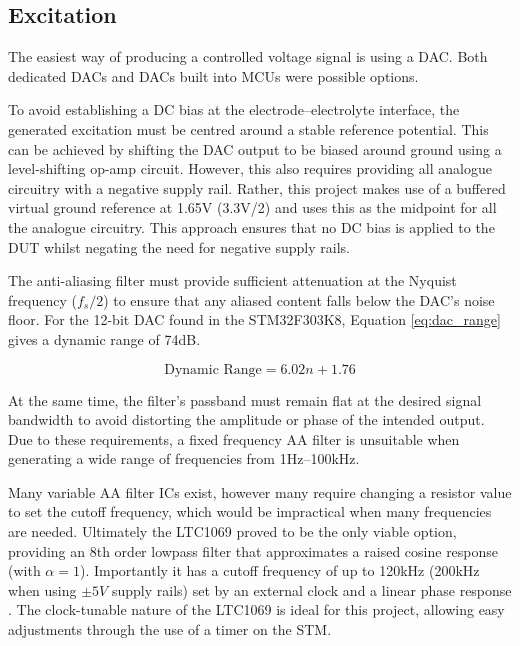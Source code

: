 
\subsection{Excitation}\label{subsec:design_excitation}
The easiest way of producing a controlled voltage signal is using a \ac{DAC}. Both dedicated \acp{DAC} and \acp{DAC} built into \acp{MCU} were possible options.

To avoid establishing a DC bias at the electrode–electrolyte interface, the generated excitation must be centred around a stable reference potential. This can be achieved by shifting the DAC output to be biased around ground using a level-shifting op-amp circuit. However, this also requires providing all analogue circuitry with a negative supply rail. Rather, this project makes use of a buffered virtual ground reference at 1.65V (3.3V/2) and uses this as the midpoint for all the analogue circuitry. This approach ensures that no DC bias is applied to the \ac{DUT} whilst negating the need for negative supply rails.

The anti-aliasing filter must provide sufficient attenuation at the Nyquist frequency ($f_s/2$) to ensure that any aliased content falls below the DAC's noise floor. For the 12-bit \ac{DAC} found in the STM32F303K8, Equation \ref{eq:dac_range} gives a dynamic range of 74dB. 

\begin{equation}
    \text{Dynamic Range}=6.02n + 1.76 
    \label{eq:dac_range}
\end{equation}

At the same time, the filter's passband must remain flat at the desired signal bandwidth to avoid distorting the amplitude or phase of the intended output. Due to these requirements, a fixed frequency AA filter is unsuitable when generating a wide range of frequencies from 1Hz--100kHz.

Many variable AA filter ICs exist, however many require changing a resistor value to set the cutoff frequency, which would be impractical when many frequencies are needed. Ultimately the LTC1069 proved to be the only viable option, providing an 8th order lowpass filter that approximates a raised cosine response (with $\alpha=1$). Importantly it has a cutoff frequency of up to 120kHz (200kHz when using $\pm5V$ supply rails) set by an external clock and a linear phase response \cite{LTC10697CS8PBF}. The clock-tunable nature of the LTC1069 is ideal for this project, allowing easy adjustments through the use of a timer on the STM.

